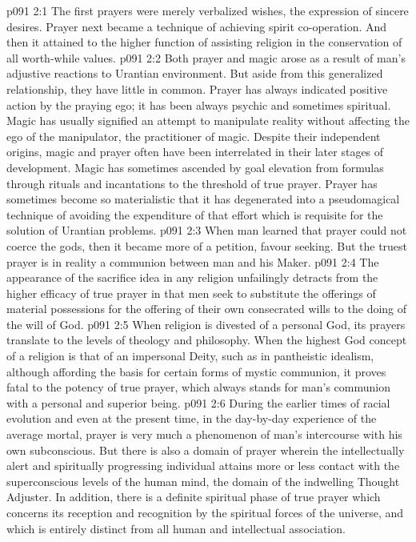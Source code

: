 \vs p091 2:1 The first prayers were merely verbalized wishes, the expression of sincere desires. Prayer next became a technique of achieving spirit co\hyp{}operation. And then it attained to the higher function of assisting religion in the conservation of all worth\hyp{}while values.
\vs p091 2:2 Both prayer and magic arose as a result of man’s adjustive reactions to Urantian environment. But aside from this generalized relationship, they have little in common. Prayer has always indicated positive action by the praying ego; it has been always psychic and sometimes spiritual. Magic has usually signified an attempt to manipulate reality without affecting the ego of the manipulator, the practitioner of magic. Despite their independent origins, magic and prayer often have been interrelated in their later stages of development. Magic has sometimes ascended by goal elevation from formulas through rituals and incantations to the threshold of true prayer. Prayer has sometimes become so materialistic that it has degenerated into a pseudomagical technique of avoiding the expenditure of that effort which is requisite for the solution of Urantian problems.
\vs p091 2:3 \pc When man learned that prayer could not coerce the gods, then it became more of a petition, favour seeking. But the truest prayer is in reality a communion between man and his Maker.
\vs p091 2:4 \pc The appearance of the sacrifice idea in any religion unfailingly detracts from the higher efficacy of true prayer in that men seek to substitute the offerings of material possessions for the offering of their own consecrated wills to the doing of the will of God.
\vs p091 2:5 When religion is divested of a personal God, its prayers translate to the levels of theology and philosophy. When the highest God concept of a religion is that of an impersonal Deity, such as in pantheistic idealism, although affording the basis for certain forms of mystic communion, it proves fatal to the potency of true prayer, which always stands for man’s communion with a personal and superior being.
\vs p091 2:6 During the earlier times of racial evolution and even at the present time, in the day\hyp{}by\hyp{}day experience of the average mortal, prayer is very much a phenomenon of man’s intercourse with his own subconscious. But there is also a domain of prayer wherein the intellectually alert and spiritually progressing individual attains more or less contact with the superconscious levels of the human mind, the domain of the indwelling Thought Adjuster. In addition, there is a definite spiritual phase of true prayer which concerns its reception and recognition by the spiritual forces of the universe, and which is entirely distinct from all human and intellectual association.
